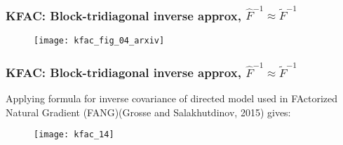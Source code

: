 \begin{frame}
\frametitle{KFAC: Block-tridiagonal inverse approx, $\hat{F}^{-1} \approx \tilde{F}^{-1}$}
\begin{figure}
    \centering
    \texttt{[image: kfac\_fig\_04\_arxiv]}
\end{figure}
\end{frame}

\begin{frame}
\frametitle{KFAC: Block-tridiagonal inverse approx, $\hat{F}^{-1} \approx \tilde{F}^{-1}$}
Applying formula for inverse covariance of directed model used in FActorized Natural Gradient (FANG)(Grosse and Salakhutdinov, 2015)
gives:

\begin{figure}
    \centering
    \texttt{[image: kfac\_14]}
\end{figure}

\end{frame}


